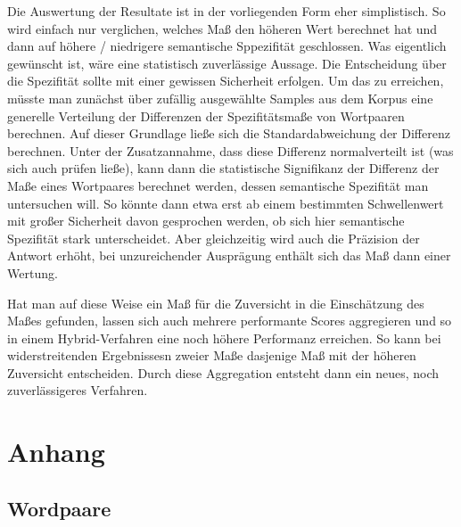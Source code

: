 \documentclass[11pt,numbers=noenddot]{scrartcl}
\begin{document}
Die Auswertung der Resultate ist in der vorliegenden Form eher simplistisch. So wird einfach nur verglichen, welches Maß den höheren Wert berechnet hat und dann auf höhere / niedrigere semantische Sppezifität geschlossen. Was eigentlich gewünscht ist, wäre eine statistisch zuverlässige Aussage. Die Entscheidung über die Spezifität sollte mit einer gewissen Sicherheit erfolgen. Um das zu erreichen, müsste man zunächst über zufällig ausgewählte Samples aus dem Korpus eine generelle Verteilung der Differenzen der Spezifitätsmaße von Wortpaaren berechnen. Auf dieser Grundlage ließe sich die Standardabweichung der Differenz berechnen. Unter der Zusatzannahme, dass diese Differenz normalverteilt ist (was sich auch prüfen ließe), kann dann die statistische Signifikanz der Differenz der Maße eines Wortpaares berechnet werden, dessen semantische Spezifität man untersuchen will. So könnte dann etwa erst ab einem bestimmten Schwellenwert mit großer Sicherheit davon gesprochen werden, ob sich hier semantische Spezifität stark unterscheidet. Aber gleichzeitig wird auch die Präzision der Antwort erhöht, bei unzureichender Ausprägung enthält sich das Maß dann einer Wertung.

Hat man auf diese Weise ein Maß für die Zuversicht in die Einschätzung des Maßes gefunden, lassen sich auch mehrere performante Scores aggregieren und so in einem Hybrid-Verfahren eine noch höhere Performanz erreichen. So kann bei widerstreitenden Ergebnissesn zweier Maße dasjenige Maß mit der höheren Zuversicht entscheiden. Durch diese Aggregation entsteht dann ein neues, noch zuverlässigeres Verfahren.



\section{Anhang}

\subsection{Wordpaare}
\end{document}
